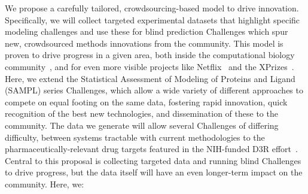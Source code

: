 \documentclass[11pt]{article}
\begin{document}
We propose a carefully tailored, crowdsourcing-based model to drive innovation. 
Specifically, we will collect targeted experimental datasets that highlight specific modeling challenges and use these for blind prediction Challenges which spur new, crowdsourced methods innovations from the community.
This model is proven to drive progress in a given area, both inside the computational biology community~\cite{Moult:2014:Proteins, Monastyrskyy:2016:Proteins, Moult:2016:Proteins, Prill:2011:Sci.Signal., Eisenstein:2013:NatBiotech, Saez-Rodriguez:2016:NatRevGenet}, and for even more visible projects like Netflix~\cite{Bell:2010:CHANCE} and the XPrizes~\cite{::XPRIZE, Kay:2011:R&DManage, XPrize:2017:Wikipedia}. 
Here, we extend the Statistical Assessment of Modeling of Proteins and Ligand (SAMPL) series Challenges, which allow a wide variety of different approaches to compete on equal footing on the same data, fostering rapid innovation, quick recognition of the best new technologies, and dissemination of these to the community. 
The data we generate will allow several Challenges of differing difficulty, between systems tractable with current methodologies to the pharmaceutically-relevant drug targets featured in the NIH-funded D3R effort~\cite{Gathiaka:2016:JComputAidedMolDes}.
Central to this proposal is collecting targeted data and running blind Challenges to drive progress, but the data itself will have an even longer-term impact on the community.
Here, we:
\end{document}
